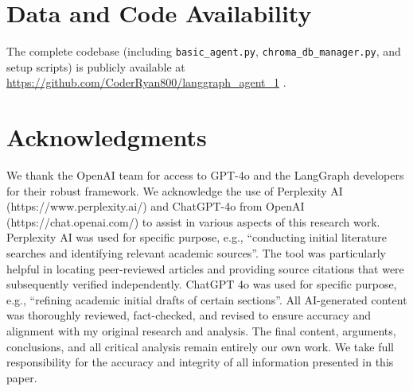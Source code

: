 \documentclass[11pt]{article}
\begin{document}
\section*{Data and Code Availability}
The complete codebase (including \texttt{basic\_agent.py}, 
\texttt{chroma\_db\_manager.py}, and setup scripts) is 
publicly available at \url{https://github.com/CoderRyan800/langgraph_agent_1} \cite{LangGraphAgent2025}.


\section*{Acknowledgments}
We thank the OpenAI team for  access to GPT-4o and the LangGraph developers for their robust framework.
We acknowledge the use of Perplexity AI (https://www.perplexity.ai/) and ChatGPT-4o from OpenAI
(https://chat.openai.com/) to assist in various aspects of this research work.
Perplexity AI was used for specific purpose, e.g., “conducting initial literature searches 
and identifying relevant academic sources”. The tool was particularly helpful in 
locating peer-reviewed articles and providing source citations that were subsequently verified independently.
ChatGPT 4o was used for specific purpose, e.g., “refining academic initial drafts 
of certain sections”. All AI-generated content was thoroughly reviewed, fact-checked, 
and revised to ensure accuracy and alignment with my original research and analysis.
The final content, arguments, conclusions, and all critical analysis remain 
entirely our own work. We take full responsibility for the accuracy and integrity 
of all information presented in this paper.



\end{document}

